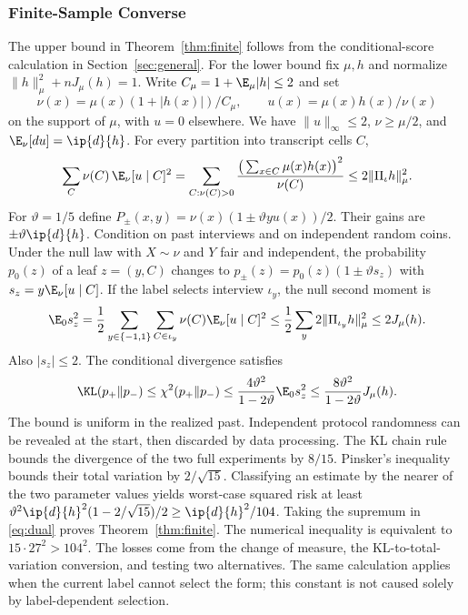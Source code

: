 \subsubsection{Finite-Sample Converse}
The upper bound in Theorem~\ref{thm:finite} follows from the conditional-score calculation in Section~\ref{sec:general}. For the lower bound fix $\mu,h$ and normalize $\|h\|_\mu^2+nJ_\mu(h)=1$. Write $C_\mu=1+\E_\mu|h|\le2$ and set
\[
 \nu(x)=\mu(x)(1+|h(x)|)/C_\mu,\qquad
 u(x)=\mu(x)h(x)/\nu(x)
\]
on the support of $\mu$, with $u=0$ elsewhere. We have $\|u\|_\infty\le2$, $\nu\ge\mu/2$, and $\E_\nu[du]=\ip{d}{h}$. For every partition into transcript cells $C$,
\[
 \sum_C \nu(C)\,\E_\nu[u\mid C]^2
  =\sum_{C:\nu(C)>0}\frac{\big(\sum_{x\in C}\mu(x)h(x)\big)^2}{\nu(C)}
  \le 2\|\Pi_\iota h\|_\mu^2 .
\]
For $\vartheta=1/5$ define $P_\pm(x,y)=\nu(x)(1\pm \vartheta y u(x))/2$. Their gains are $\pm \vartheta\ip{d}{h}$. Condition on past interviews and on independent random coins. Under the null law with $X\sim\nu$ and $Y$ fair and independent, the probability $p_0(z)$ of a leaf $z=(y,C)$ changes to $p_\pm(z)=p_0(z)(1\pm \vartheta s_z)$ with $s_z=y\E_\nu[u\mid C]$. If the label selects interview $\iota_y$, the null second moment is
\[
 \E_0s_z^2=\frac12\sum_{y\in\{-1,1\}}\sum_{C\in \iota_y}
       \nu(C)\E_\nu[u\mid C]^2
 \le\frac12\sum_y 2\|\Pi_{\iota_y}h\|_\mu^2\le2J_\mu(h).
\]
Also $|s_z|\le2$. The conditional divergence satisfies
\[
 \KL(p_+\Vert p_-)\le\chi^2(p_+\Vert p_-)
    \le \frac{4\vartheta^2}{1-2\vartheta}\E_0 s_z^2
    \le \frac{8\vartheta^2}{1-2\vartheta}J_\mu(h).
\]
The bound is uniform in the realized past. Independent protocol randomness can be revealed at the start, then discarded by data processing. The KL chain rule bounds the divergence of the two full experiments by $8/15$. Pinsker's inequality bounds their total variation by $2/\sqrt{15}$. Classifying an estimate by the nearer of the two parameter values yields worst-case squared risk at least $\vartheta^2\ip{d}{h}^2(1-2/\sqrt{15})/2\ge\ip{d}{h}^2/104$. Taking the supremum in \eqref{eq:dual} proves Theorem~\ref{thm:finite}. The numerical inequality is equivalent to $15\cdot27^2>104^2$. The losses come from the change of measure, the KL-to-total-variation conversion, and testing two alternatives. The same calculation applies when the current label cannot select the form; this constant is not caused solely by label-dependent selection.

